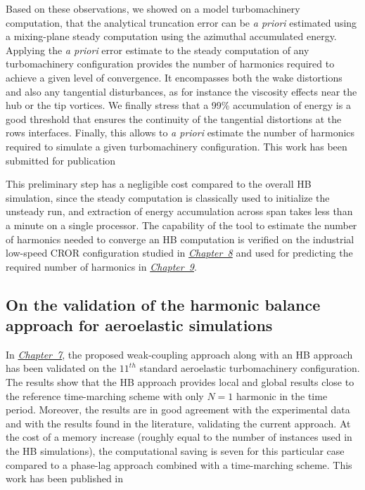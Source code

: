 Based on these observations,
we showed on a model turbomachinery computation, that
the analytical truncation error can be \emph{a priori} 
estimated using a mixing-plane steady computation
using the azimuthal accumulated energy.
Applying the \emph{a priori} error estimate to 
the steady computation of any turbomachinery configuration
provides the number of harmonics required 
to achieve a given level of convergence.
It encompasses both the wake distortions and also
any tangential disturbances, as for instance
the viscosity effects near the hub or the tip vortices.
We finally stress that a  99\% accumulation of energy
is a good threshold
that ensures the continuity of the tangential distortions at the rows
interfaces. Finally, this allows to \emph{a priori}
estimate the number of harmonics required to simulate
a given turbomachinery configuration.
This work has been submitted for publication
\begin{quote}
\end{quote}

This preliminary step has a negligible cost compared to the overall HB
simulation, since the steady computation is classically used to initialize 
the unsteady run, and extraction of energy accumulation across span takes 
less than a minute on a single processor. The capability of the
tool to estimate the number of harmonics needed
to converge an HB computation is verified on the industrial low-speed CROR configuration
studied in \hyperref[cha:dream_ls_isolated]{\emph{Chapter~8}}
and used for predicting the
required number of harmonics in \hyperref[cha:dream_hs_isolated]{\emph{Chapter~9}}.

\subsection*{On the validation of the harmonic balance approach for aeroelastic simulations}

In \hyperref[cha:stcf11]{\emph{Chapter~7}}, 
the proposed weak-coupling approach along with
an HB approach has been
validated on the $11^{th}$ standard aeroelastic turbomachinery
configuration.
The results show that the HB approach provides local
and global results close to the reference time-marching scheme 
with only $N=1$ harmonic in the time period. 
Moreover, the results are
in good agreement with the experimental data and with the results
found in the literature, validating the current approach.
At the cost of a memory
increase (roughly equal to the number of instances used in the HB
simulations), the computational saving is seven for this
particular case compared to a phase-lag approach combined
with a time-marching scheme. 
This work has been published in
\begin{quote}
\end{quote}

